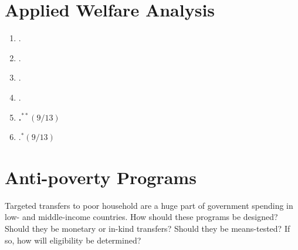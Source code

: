 \documentclass[11pt]{article}
\begin{document}
\section{Applied Welfare Analysis}

\begin{enumerate}
\item {}.
\item {}.
\item {}.
\item {}.
\item \textbf{.$^{**}(9/13)$}
\item {}.$^{*}(9/13)$
\end{enumerate}

\section{ Anti-poverty Programs}
Targeted transfers to poor household are a huge part of government spending in low- and middle-income countries. How should these programs be designed? Should they be monetary or in-kind transfers? Should they be means-tested? If so, how will eligibility be determined?
\end{document}
